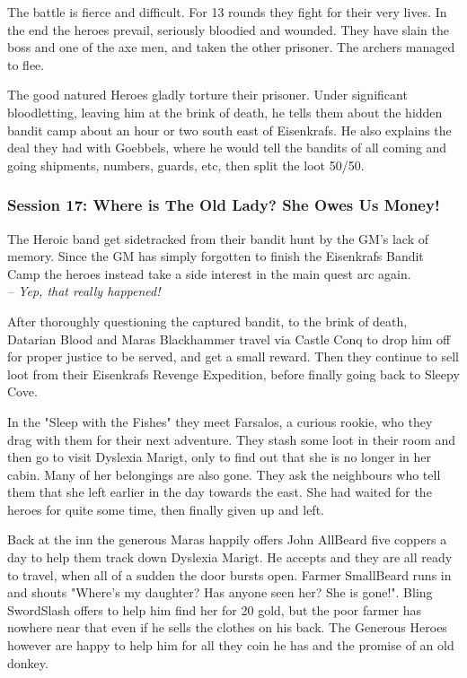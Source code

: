 The battle is fierce and difficult. For 13 rounds they fight for their very lives. In the end the heroes prevail, seriously bloodied and wounded. They have slain the boss and one of the axe men, and taken the other prisoner. The archers managed to flee.

The good natured Heroes gladly torture their prisoner. Under significant bloodletting, leaving him at the brink of death, he tells them about the hidden bandit camp about an hour or two south east of Eisenkrafs. He also explains the deal they had with Goebbels, where he would tell the bandits of all coming and going shipments, numbers, guards, etc, then split the loot 50/50.


\subsubsection*{Session 17: Where is The Old Lady? She Owes Us Money!}
\begin{readoutloud}
The Heroic band get sidetracked from their bandit hunt by the GM's lack of memory. Since the GM has simply forgotten to finish the Eisenkrafs Bandit Camp the heroes instead take a side interest in the main quest arc again.\\
\emph{-- Yep, that really happened!}
\end{readoutloud}

After thoroughly questioning the captured bandit, to the brink of death, Datarian Blood and Maras Blackhammer travel via Castle Conq to drop him off for proper justice to be served, and get a small reward. Then they continue to sell loot from their Eisenkrafs Revenge Expedition, before finally going back to Sleepy Cove.

In the "Sleep with the Fishes" they meet Farsalos, a curious rookie, who they drag with them for their next adventure. They stash some loot in their room and then go to visit Dyslexia Marigt, only to find out that she is no longer in her cabin. Many of her belongings are also gone. They ask the neighbours who tell them that she left earlier in the day towards the east. She had waited for the heroes for quite some time, then finally given up and left.

Back at the inn the generous Maras happily offers John AllBeard five coppers a day to help them track down Dyslexia Marigt. He accepts and they are all ready to travel, when all of a sudden the door bursts open. Farmer SmallBeard runs in and shouts "Where's my daughter? Has anyone seen her? She is gone!". Bling SwordSlash offers to help him find her for 20 gold, but the poor farmer has nowhere near that even if he sells the clothes on his back. The Generous Heroes however are happy to help him for all they coin he has and the promise of an old donkey.

